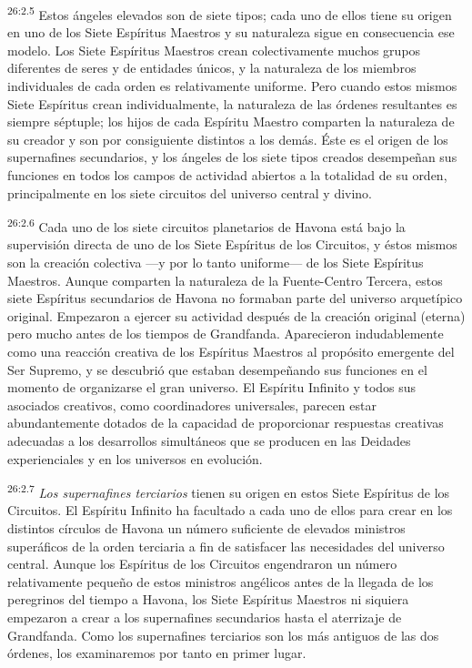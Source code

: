\par
\textsuperscript{26:2.5} Estos ángeles elevados son de siete tipos; cada uno de ellos tiene su origen en uno de los Siete Espíritus Maestros y su naturaleza sigue en consecuencia ese modelo. Los Siete Espíritus Maestros crean colectivamente muchos grupos diferentes de seres y de entidades únicos, y la naturaleza de los miembros individuales de cada orden es relativamente uniforme. Pero cuando estos mismos Siete Espíritus crean individualmente, la naturaleza de las órdenes resultantes es siempre séptuple; los hijos de cada Espíritu Maestro comparten la naturaleza de su creador y son por consiguiente distintos a los demás. Éste es el origen de los supernafines secundarios, y los ángeles de los siete tipos creados desempeñan sus funciones en todos los campos de actividad abiertos a la totalidad de su orden, principalmente en los siete circuitos del universo central y divino.

\par
\textsuperscript{26:2.6} Cada uno de los siete circuitos planetarios de Havona está bajo la supervisión directa de uno de los Siete Espíritus de los Circuitos, y éstos mismos son la creación colectiva ---y por lo tanto uniforme--- de los Siete Espíritus Maestros. Aunque comparten la naturaleza de la Fuente-Centro Tercera, estos siete Espíritus secundarios de Havona no formaban parte del universo arquetípico original. Empezaron a ejercer su actividad después de la creación original (eterna) pero mucho antes de los tiempos de Grandfanda. Aparecieron indudablemente como una reacción creativa de los Espíritus Maestros al propósito emergente del Ser Supremo, y se descubrió que estaban desempeñando sus funciones en el momento de organizarse el gran universo. El Espíritu Infinito y todos sus asociados creativos, como coordinadores universales, parecen estar abundantemente dotados de la capacidad de proporcionar respuestas creativas adecuadas a los desarrollos simultáneos que se producen en las Deidades experienciales y en los universos en evolución.

\par
\textsuperscript{26:2.7} \textit{Los supernafines terciarios} tienen su origen en estos Siete Espíritus de los Circuitos. El Espíritu Infinito ha facultado a cada uno de ellos para crear en los distintos círculos de Havona un número suficiente de elevados ministros superáficos de la orden terciaria a fin de satisfacer las necesidades del universo central. Aunque los Espíritus de los Circuitos engendraron un número relativamente pequeño de estos ministros angélicos antes de la llegada de los peregrinos del tiempo a Havona, los Siete Espíritus Maestros ni siquiera empezaron a crear a los supernafines secundarios hasta el aterrizaje de Grandfanda. Como los supernafines terciarios son los más antiguos de las dos órdenes, los examinaremos por tanto en primer lugar.

